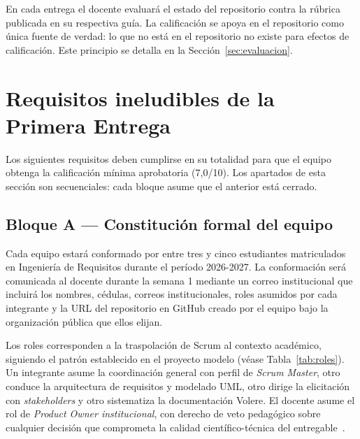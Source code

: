 \documentclass[11pt,a4paper]{article}
\begin{document}
En cada entrega el docente evaluar\'a el estado del repositorio contra la r\'ubrica publicada en su respectiva gu\'ia. La calificaci\'on se apoya en el repositorio como \'unica fuente de verdad: lo que no est\'a en el repositorio no existe para efectos de calificaci\'on. Este principio se detalla en la Secci\'on~\ref{sec:evaluacion}.

\section{Requisitos ineludibles de la Primera Entrega}

Los siguientes requisitos deben cumplirse en su totalidad para que el equipo obtenga la calificaci\'on m\'inima aprobatoria (7,0/10). Los apartados de esta secci\'on son secuenciales: cada bloque asume que el anterior est\'a cerrado.

\subsection{Bloque A --- Constituci\'on formal del equipo}

Cada equipo estar\'a conformado por entre tres y cinco estudiantes matriculados en Ingenier\'ia de Requisitos durante el per\'iodo 2026-2027. La conformaci\'on ser\'a comunicada al docente durante la semana 1 mediante un correo institucional que incluir\'a los nombres, c\'edulas, correos institucionales, roles asumidos por cada integrante y la URL del repositorio en GitHub creado por el equipo bajo la organizaci\'on p\'ublica que ellos elijan.

Los roles corresponden a la traspolaci\'on de Scrum al contexto acad\'emico, siguiendo el patr\'on establecido en el proyecto modelo (v\'ease Tabla~\ref{tab:roles}). Un integrante asume la coordinaci\'on general con perfil de \emph{Scrum Master}, otro conduce la arquitectura de requisitos y modelado UML, otro dirige la elicitaci\'on con \emph{stakeholders} y otro sistematiza la documentaci\'on Volere. El docente asume el rol de \emph{Product Owner institucional}, con derecho de veto pedag\'ogico sobre cualquier decisi\'on que comprometa la calidad cient\'ifico-t\'ecnica del entregable~\cite{schwaber2020scrum,kniberg2010kanban}.
\end{document}
